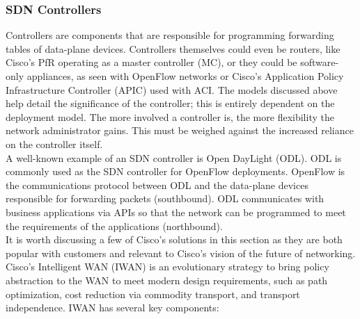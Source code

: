 \subsubsection{SDN Controllers}
Controllers are components that are responsible for programming forwarding
tables of data-plane devices. Controllers themselves could even be routers,
like Cisco’s PfR operating as a master controller (MC), or they could be
software-only appliances, as seen with OpenFlow networks or Cisco’s
Application Policy Infrastructure Controller (APIC) used with ACI. The models
discussed above help detail the significance of the controller; this is
entirely dependent on the deployment model. The more involved a controller is,
the more flexibility the network administrator gains. This must be weighed
against the increased reliance on the controller itself. \\

A well-known example of an SDN controller is Open DayLight (ODL). ODL is
commonly used as the SDN controller for OpenFlow deployments. OpenFlow is the
communications protocol between ODL and the data-plane devices responsible for
forwarding packets (southbound). ODL communicates with business applications
via APIs so that the network can be programmed to meet the requirements of the
applications (northbound). \\

It is worth discussing a few of Cisco’s solutions in this section as they are
both popular with customers and relevant to Cisco’s vision of the future of
networking. Cisco’s Intelligent WAN (IWAN) is an evolutionary strategy to
bring policy abstraction to the WAN to meet modern design requirements, such
as path optimization, cost reduction via commodity transport, and transport
independence. IWAN has several key components:

